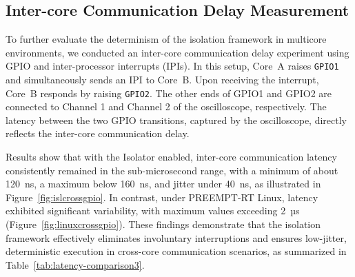 \documentclass[letterpaper]{article}
\begin{document}
\begin{table}[t]
\centering
{}
\caption{Latency comparison under different configurations (Timestamp counter based).}
\label{tab:latency-comparison1}
\end{table}


\subsection{Inter-core Communication Delay Measurement}

To further evaluate the determinism of the isolation framework in multicore environments, we
conducted an inter-core communication delay experiment using GPIO and inter-processor interrupts (IPIs).
In this setup, Core~A raises \texttt{GPIO1} and simultaneously sends an IPI to Core~B. Upon receiving
the interrupt, Core~B responds by raising \texttt{GPIO2}.
The other ends of GPIO1 and GPIO2 are connected to Channel 1 and Channel 2 of the oscilloscope, respectively.
The latency between the two GPIO transitions,
captured by the oscilloscope, directly reflects the inter-core communication delay.


\begin{table}[t]
\centering
{}
\caption{Latency comparison under different configurations (Inter-core communication delay).}
\label{tab:latency-comparison3}
\end{table}

Results show that with the Isolator enabled, inter-core communication latency consistently remained
in the sub-microsecond range, with a minimum of about 120~ns, a maximum below 160~ns, and jitter
under 40~ns, as illustrated in Figure~\ref{fig:islcrossgpio}. In contrast, under PREEMPT-RT Linux,
latency exhibited significant variability, with maximum values exceeding 2~µs
(Figure~\ref{fig:linuxcrossgpio}). These findings demonstrate that the isolation framework effectively
eliminates involuntary interruptions and ensures low-jitter, deterministic execution in cross-core
communication scenarios, as summarized in Table~\ref{tab:latency-comparison3}.
\end{document}
